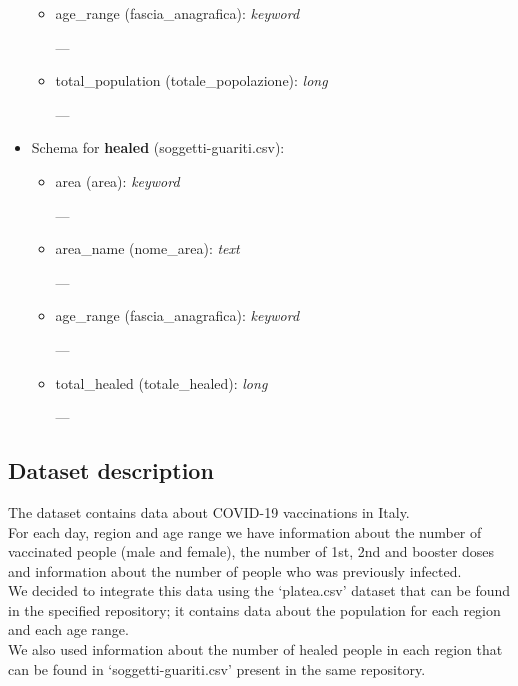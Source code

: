 \documentclass[12pt, a4paper]{article}
\begin{document}
\begin{itemize}
\begin{itemize}
            \item age\_range (fascia\_anagrafica): \emph{keyword} \\
                \begin{footnotesize}
                    ---
                \end{footnotesize}
            \item total\_population (totale\_popolazione): \emph{long} \\
                \begin{footnotesize}
                    ---
                \end{footnotesize}
        \end{itemize}
    \item Schema for \textbf{healed} (soggetti-guariti.csv):
    \begin{itemize}
        \item area (area): \emph{keyword} \\
            \begin{footnotesize}
                ---
            \end{footnotesize}
        \item area\_name (nome\_area): \emph{text} \\
            \begin{footnotesize}
                ---
            \end{footnotesize}
        \item age\_range (fascia\_anagrafica): \emph{keyword} \\
            \begin{footnotesize}
                ---
            \end{footnotesize}
        \item total\_healed (totale\_healed): \emph{long} \\
            \begin{footnotesize}
                ---
            \end{footnotesize}
    \end{itemize}
\end{itemize}

\subsection{Dataset description}

The dataset contains data about COVID-19 vaccinations in Italy. \\
For each day, region and age range we have information about the number of vaccinated 
people (male and female), the number of 1st, 2nd and booster doses and information 
about the number of people who was previously infected. \\
We decided to integrate this data using the ‘platea.csv’ dataset that can be found 
in the specified repository; it contains data about the population for each region 
and each age range. \\ 
We also used information about the number of healed people in each region that can be 
found in ‘soggetti-guariti.csv’ present in the same repository.
\end{document}
